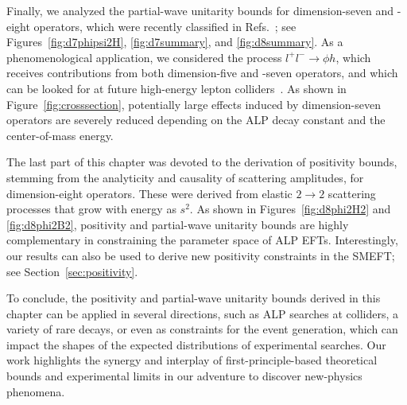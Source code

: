 Finally, we analyzed the partial-wave unitarity bounds for dimension-seven and -eight operators, which were recently classified in Refs.~\cite{Song:2023lxf,Grojean:2023tsd,Bertuzzo:2023slg}; see
Figures~\ref{fig:d7phipsi2H}, \ref{fig:d7summary}, and \ref{fig:d8summary}.
As a phenomenological application, we considered the process $l^+ l^- \to \phi h$, which receives contributions from both dimension-five and -seven operators, and which can be looked for at future high-energy lepton colliders~\cite{Grojean:2023tsd}. As shown in Figure~\ref{fig:crosssection}, potentially large effects induced by dimension-seven operators are severely reduced depending on the ALP decay constant and the center-of-mass energy.

The last part of this chapter was devoted to the derivation of positivity bounds, stemming from the analyticity and causality of scattering amplitudes, for dimension-eight operators. These were derived from elastic $2 \to 2$ scattering processes that grow with energy as $s^2$.
As shown in Figures~\ref{fig:d8phi2H2} and \ref{fig:d8phi2B2}, positivity and partial-wave unitarity bounds are highly complementary in constraining the parameter space of ALP EFTs. 
Interestingly, our results can also be used to derive new positivity constraints in the SMEFT; see Section~\ref{sec:positivity}.

To conclude, the positivity and partial-wave unitarity bounds derived in this chapter can be applied in several directions, such as ALP searches at colliders, a variety of rare decays, or even as constraints for the event generation, which can impact the shapes of the expected distributions of experimental searches. 
Our work highlights the synergy and interplay of first-principle-based theoretical bounds and experimental limits in our adventure to discover new-physics phenomena.

\begin{subappendices}
    
    
\end{subappendices}